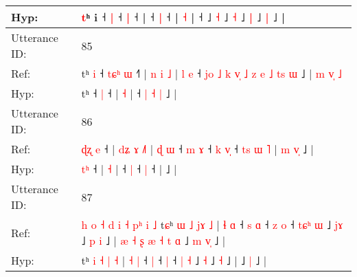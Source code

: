 \documentclass[10pt]{article}
\DeclareRobustCommand{\hl}[1]{{\textcolor{red}{#1}}}
\begin{document}
\begin{longtable}{ll}
 \\
Hyp: & \hl{}\hl{}\hl{}\hl{}\hl{}\hl{}\hl{}\hl{}\hl{}\hl{}\hl{}\hl{}\hl{}\hl{}\hl{}\hl{}\hl{}\hl{}\hl{}\hl{}\hl{}\hl{}\hl{t}ʰ i ˧\hl{}\hl{} \hl{|} ˧\hl{}\hl{} \hl{|} ˧\hl{}\hl{}\hl{}\hl{}\hl{}\hl{}\hl{}\hl{}\hl{}\hl{}\hl{}\hl{} |\hl{}\hl{}\hl{}\hl{} ˧\hl{}\hl{}\hl{}\hl{} \hl{|} ˧\hl{}\hl{}\hl{}\hl{}\hl{}\hl{}\hl{} |\hl{}\hl{}\hl{}\hl{}\hl{} \hl{}\hl{˧} |\hl{}\hl{}\hl{}\hl{}\hl{} ˧\hl{}\hl{}\hl{}\hl{}\hl{} ˩\hl{}\hl{} \hl{˧} ˩\hl{}\hl{} \hl{}\hl{˧} ˩\hl{}\hl{} \hl{}\hl{|} ˩\hl{}\hl{}\hl{} \hl{|} ˩ |\hl{}\hl{}\hl{}\hl{}\hl{}\hl{}\hl{}
 \\
\midrule
Utterance ID: & 85 \\
Ref: & tʰ\hl{ }\hl{i} ˧\hl{ }\hl{t}\hl{ɕ}\hl{ʰ} \hl{ɯ} ˧\hl{˥} |\hl{ }\hl{n}\hl{ }\hl{i} \hl{˩} |\hl{ }\hl{l}\hl{ }\hl{e} ˧\hl{ }\hl{j}\hl{o}\hl{ }\hl{˩}\hl{ }\hl{k}\hl{ }\hl{v}\hl{̩}\hl{ }\hl{˩}\hl{ }\hl{z}\hl{ }\hl{e} \hl{˩} \hl{t}\hl{s} \hl{ɯ} ˩ |\hl{ }\hl{m}\hl{ }\hl{v}\hl{̩}\hl{ }\hl{˩}
 \\
Hyp: & tʰ\hl{}\hl{} ˧\hl{}\hl{}\hl{}\hl{} \hl{|} ˧\hl{} |\hl{}\hl{}\hl{}\hl{} \hl{˧} |\hl{}\hl{}\hl{}\hl{} ˧\hl{}\hl{}\hl{}\hl{}\hl{}\hl{}\hl{}\hl{}\hl{}\hl{}\hl{}\hl{}\hl{}\hl{}\hl{}\hl{} \hl{|} \hl{}\hl{˧} \hl{|} ˩ |\hl{}\hl{}\hl{}\hl{}\hl{}\hl{}\hl{}
 \\
\midrule
Utterance ID: & 86 \\
Ref: & \hl{ɖ}\hl{ʐ}\hl{ }\hl{e} ˧ |\hl{ }\hl{d}\hl{ʑ}\hl{ }\hl{ɤ} \hl{˩}\hl{˥} |\hl{ }\hl{ɖ}\hl{ }\hl{ɯ} ˧\hl{ }\hl{m} \hl{ɤ} ˧\hl{ }\hl{k} \hl{v}\hl{̩} ˧\hl{ }\hl{t}\hl{s}\hl{ }\hl{ɯ}\hl{ }\hl{˥} |\hl{ }\hl{m}\hl{ }\hl{v}\hl{̩} ˩ |
 \\
Hyp: & \hl{}\hl{}\hl{t}\hl{ʰ} ˧ |\hl{}\hl{}\hl{}\hl{}\hl{} \hl{}\hl{˧} |\hl{}\hl{}\hl{}\hl{} ˧\hl{}\hl{} \hl{|} ˧\hl{}\hl{} \hl{}\hl{|} ˧\hl{}\hl{}\hl{}\hl{}\hl{}\hl{}\hl{} |\hl{}\hl{}\hl{}\hl{}\hl{} ˩ |
 \\
\midrule
Utterance ID: & 87 \\
Ref: & \hl{h}\hl{ }\hl{o}\hl{ }\hl{˧}\hl{ }\hl{d}\hl{ }\hl{i}\hl{ }\hl{˧}\hl{ }\hl{p}\hl{ʰ}\hl{ }\hl{i}\hl{ }\hl{˩}\hl{ }t\hl{ɕ}ʰ \hl{ɯ} \hl{˩} \hl{j}\hl{ɤ} \hl{˩} | \hl{ɬ} \hl{ɑ} ˧\hl{ }\hl{s} \hl{ɑ} ˧\hl{ }\hl{z} \hl{o} ˧ \hl{t}\hl{ɕ}\hl{ʰ} \hl{ɯ} ˩ \hl{j}\hl{ɤ} ˩\hl{ }\hl{p} \hl{i} ˩ |\hl{ }\hl{æ}\hl{ }\hl{˧}\hl{ }\hl{ʂ}\hl{ }\hl{æ}\hl{ }\hl{˧}\hl{ }\hl{t}\hl{ }\hl{ɑ} ˩\hl{ }\hl{m} \hl{v}\hl{̩} ˩ |
 \\
Hyp: & \hl{}\hl{}\hl{}\hl{}\hl{}\hl{}\hl{}\hl{}\hl{}\hl{}\hl{}\hl{}\hl{}\hl{}\hl{}\hl{}\hl{}\hl{}\hl{}t\hl{}ʰ \hl{i} \hl{˧} \hl{}\hl{|} \hl{˧} | \hl{˧} \hl{|} ˧\hl{}\hl{} \hl{|} ˧\hl{}\hl{} \hl{|} ˧ \hl{}\hl{}\hl{|} \hl{˧} ˩ \hl{}\hl{˧} ˩\hl{}\hl{} \hl{˧} ˩ |\hl{}\hl{}\hl{}\hl{}\hl{}\hl{}\hl{}\hl{}\hl{}\hl{}\hl{}\hl{}\hl{}\hl{} ˩\hl{}\hl{} \hl{}\hl{|} ˩ |

\end{longtable}
\end{document}
